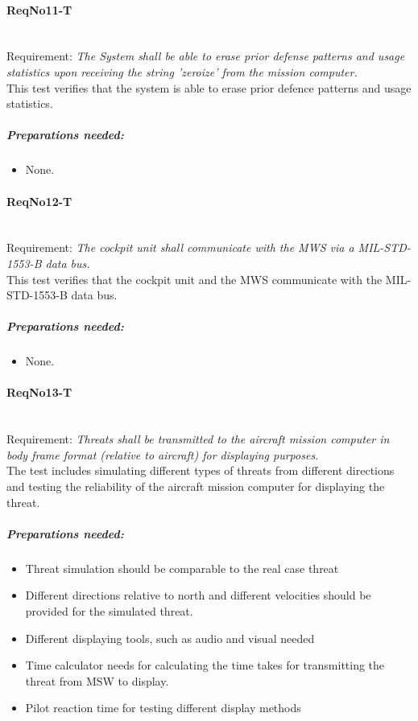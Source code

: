 \paragraph{ReqNo11-T}\mbox{}\\ %
Requirement: \textit{The System shall be able to erase prior defense patterns and usage statistics upon receiving the string 'zeroize' from the mission computer.}\\
This test verifies that the system is able to erase prior defence patterns and usage statistics.
	\subparagraph{Preparations needed:}
	\begin{itemize}
	\item None.
	\end{itemize}

\paragraph{ReqNo12-T}\mbox{}\\ %
Requirement: \textit{The cockpit unit shall communicate with the MWS via a MIL-STD-1553-B data bus.}\\
This test verifies that the cockpit unit and the MWS communicate with the MIL-STD-1553-B data bus.
	\subparagraph{Preparations needed:}
	\begin{itemize}
	\item None.
	\end{itemize}

\paragraph{ReqNo13-T}\mbox{}\\ %
Requirement: \textit{Threats shall be transmitted to the aircraft mission computer in body frame format (relative to aircraft) for displaying purposes.}\\
The test includes simulating different types of threats from different directions and testing the reliability of the aircraft mission computer for displaying the threat.
	\subparagraph{Preparations needed:}
	\begin{itemize}
	\item Threat simulation should be comparable to the real case threat
	\item Different directions relative to north and different velocities should be provided for the simulated threat.
	\item Different displaying tools, such as audio and visual needed
	\item Time calculator needs for calculating the time takes for transmitting the threat from MSW to display.
	\item Pilot reaction time for testing different display methods
	\end{itemize}

